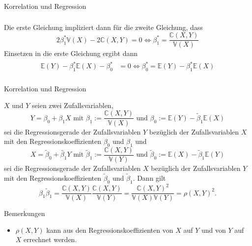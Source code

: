 \documentclass[
  8pt,
  ignorenonframetext,
]{beamer}
\providecommand{\tightlist}{%
  \setlength{\itemsep}{0pt}\setlength{\parskip}{0pt}}
\begin{document}
\begin{frame}{Korrelation und Regression}
\begin{align}
\begin{split}
\end{split}
\end{align} Die erste Gleichung impliziert dann für die zweite
Gleichung, dass \begin{equation}
2\beta_1^*\mathbb{V}(X) - 2\mathbb{C}(X,Y) = 0 \Leftrightarrow \beta_1^* = \frac{\mathbb{C}(X,Y)}{\mathbb{V}(X)}
\end{equation} Einsetzen in die erste Gleichung ergibt dann
\begin{align}
\begin{split}
\mathbb{E}(Y) - \beta_1^* \mathbb{E}(X) - \beta_0^* & = 0
\Leftrightarrow
\beta_0^*   = \mathbb{E}(Y) - \beta_1^* \mathbb{E}(X) \\
\end{split}
\end{align}
\end{frame}

\begin{frame}{Korrelation und Regression}
\protect\hypertarget{korrelation-und-regression-5}{}
\footnotesize
\begin{theorem}
\normalfont
\justifying
$X$ und $Y$ seien zwei Zufallsvariablen,
\begin{equation}
Y = \beta_0 + \beta_1 X
\mbox{ mit }
\beta_1 := \frac{\mathbb{C}(X,Y)}{\mathbb{V}(X)}
\mbox{ und }
\beta_0 := \mathbb{E}(Y) -\tilde{\beta}_1\mathbb{E}(X)
\end{equation}
sei die Regressionsgerade der Zufallsvariablen $Y$ bezüglich der Zufallsvariablen
$X$ mit den Regressionskoeffizienten  $\beta_0$ und $\beta_1$ und
\begin{equation}
X = \tilde{\beta}_0 + \tilde{\beta_1} Y
\mbox{ mit }
\tilde{\beta}_1 := \frac{\mathbb{C}(X,Y)}{\mathbb{V}(Y)}
\mbox{ und }
\tilde{\beta}_0 := \mathbb{E}(X) -\tilde{\beta}_1\mathbb{E}(Y)
\end{equation}
sei die Regressionsgerade der Zufallsvariablen $X$ bezüglich der Zufallsvariablen
$Y$ mit den Regressionskoeffizienten $\tilde{\beta}_0$ und $\tilde{\beta}_1$. Dann gilt
\begin{equation}
\beta_1 \tilde{\beta}_1
= \frac{\mathbb{C}(X,Y)}{\mathbb{V}(X)}\frac{\mathbb{C}(X,Y)}{\mathbb{V}(Y)}
= \frac{\mathbb{C}(X,Y)^2}{\mathbb{V}(X)\mathbb{V}(Y)}
= \rho(X,Y)^2.
\end{equation}
\end{theorem}

Bemerkungen

\begin{itemize}
\tightlist
\item
  \(\rho(X,Y)\) kann aus den Regressionskoeffizienten von \(X\) auf
  \(Y\) und von \(Y\) auf \(X\) errechnet werden.
\end{itemize}
\end{frame}
\end{document}
